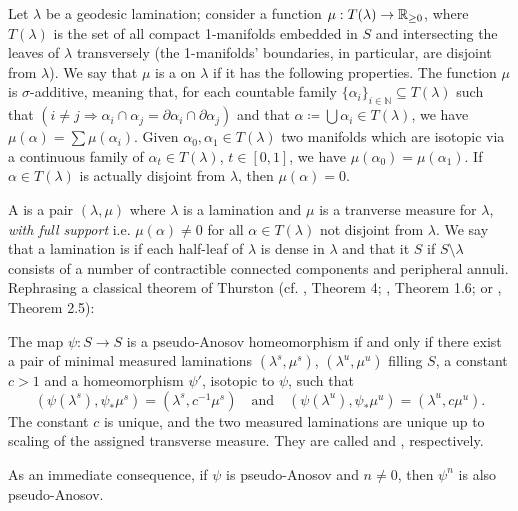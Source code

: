 Let $\lambda$ be a geodesic lamination; consider a function $\mu:T(\lambda)\rightarrow\mathbb R_{\geq 0}$, where $T(\lambda)$ is the set of all compact 1-manifolds embedded in $S$ and intersecting the leaves of $\lambda$ transversely (the 1-manifolds' boundaries, in particular, are disjoint from $\lambda$). We say that $\mu$ is a  on $\lambda$ if it has the following properties. The function $\mu$ is $\sigma$-additive, meaning that, for each countable family $\{\alpha_i\}_{i\in\mathbb N}\subseteq T(\lambda)$ such that $(i\not=j\Rightarrow \alpha_i\cap\alpha_j=\partial\alpha_i\cap\partial\alpha_j)$ and that $\alpha\coloneqq \bigcup\alpha_i\in T(\lambda)$, we have $\mu(\alpha)=\sum \mu(\alpha_i)$. Given $\alpha_0,\alpha_1\in T(\lambda)$ two manifolds which are isotopic via a continuous family of $\alpha_t\in T(\lambda)$, $t\in [0,1]$, we have $\mu(\alpha_0)=\mu(\alpha_1)$. If $\alpha\in T(\lambda)$ is actually disjoint from $\lambda$, then $\mu(\alpha)=0$.

A  is a pair $(\lambda,\mu)$ where $\lambda$ is a lamination and $\mu$ is a tranverse measure for $\lambda$, \emph{with full support} i.e. $\mu(\alpha)\not=0$ for all $\alpha\in T(\lambda)$ not disjoint from $\lambda$. We say that a lamination is  if each half-leaf of $\lambda$ is dense in $\lambda$ and that it  $S$ if $S\setminus\lambda$ consists of a number of contractible connected components and peripheral annuli. Rephrasing a classical theorem of Thurston (cf. \cite{thurston_pa}, Theorem 4; \cite{flp}, Theorem 1.6; or \cite{hyperbfibermfld}, Theorem 2.5):

\begin{theo}
The map $\psi:S\rightarrow S$ is a pseudo-Anosov homeomorphism if and only if there exist a pair of minimal measured laminations $(\lambda^s,\mu^s)$, $(\lambda^u,\mu^u)$ filling $S$, a constant $c>1$ and a homeomorphism $\psi'$, isotopic to $\psi$, such that
$$
(\psi(\lambda^s),\psi_*\mu^s)=(\lambda^s,c^{-1}\mu^s)\quad\text{and}\quad
(\psi(\lambda^u),\psi_*\mu^u)=(\lambda^u,c\mu^u).
$$
The constant $c$ is unique, and the two measured laminations are unique up to scaling of the assigned transverse measure. They are called  and , respectively.
\end{theo}

\begin{rmk}\label{rmk:power_pa}
As an immediate consequence, if $\psi$ is pseudo-Anosov and $n\not=0$, then $\psi^n$ is also pseudo-Anosov.
\end{rmk}

